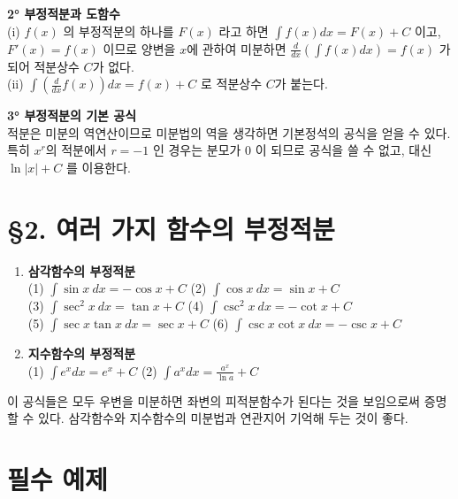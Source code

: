 \documentclass[a4paper,11pt]{article}
\begin{document}
\begin{advicebox}
\textbf{2° 부정적분과 도함수}\\
(i) $f(x)$ 의 부정적분의 하나를 $F(x)$ 라고 하면 $\int f(x)dx=F(x)+C$ 이고, $F'(x)=f(x)$ 이므로 양변을 $x$에 관하여 미분하면 $\frac{d}{dx}(\int f(x)dx)=f(x)$ 가 되어 적분상수 $C$가 없다.\\
(ii) $\int(\frac{d}{dx}f(x))dx=f(x)+C$ 로 적분상수 $C$가 붙는다.
\end{advicebox}

\begin{advicebox}
\textbf{3° 부정적분의 기본 공식}\\
적분은 미분의 역연산이므로 미분법의 역을 생각하면 기본정석의 공식을 얻을 수 있다. 특히 $x^r$의 적분에서 $r=-1$ 인 경우는 분모가 $0$ 이 되므로 공식을 쓸 수 없고, 대신 $\ln|x|+C$ 를 이용한다.
\end{advicebox}

\section*{§2. 여러 가지 함수의 부정적분}

\begin{conceptbox}[기본 정석]
\begin{enumerate}
    \item \textbf{삼각함수의 부정적분}\\
    (1) $\displaystyle \int \sin x~dx = -\cos x+C$ \qquad (2) $\displaystyle \int \cos x~dx = \sin x+C$\\
    (3) $\displaystyle \int \sec^{2}x~dx = \tan x+C$ \qquad (4) $\displaystyle \int \csc^{2}x~dx = -\cot x+C$\\
    (5) $\displaystyle \int \sec x \tan x~dx = \sec x+C$ \quad (6) $\displaystyle \int \csc x \cot x~dx = -\csc x+C$
    \item \textbf{지수함수의 부정적분}\\
    (1) $\displaystyle \int e^{x}dx = e^{x}+C$ \qquad (2) $\displaystyle \int a^{x}dx = \frac{a^{x}}{\ln a}+C$
\end{enumerate}
\end{conceptbox}

\begin{advicebox}
이 공식들은 모두 우변을 미분하면 좌변의 피적분함수가 된다는 것을 보임으로써 증명할 수 있다. 삼각함수와 지수함수의 미분법과 연관지어 기억해 두는 것이 좋다.
\end{advicebox}

\newpage

\section*{필수 예제}
\end{document}
